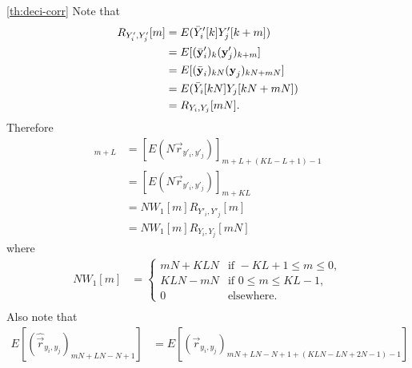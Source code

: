 \documentclass[a4paper, openany, oneside]{memoir}
\begin{document}
\begin{blockProofTheorem}{\ref{th:deci-corr}}
    Note that
    \begin{align*}
        R_{Y'_i,Y'_j}[m]
        &= E(\bar{Y}'_i[k]Y'_j[k+m]) \\
        &= E[(\bar{\boldsymbol{\mathbf{y}}}'_i)_{k}(\boldsymbol{\mathbf{y}}'_j)_{k+m}] \\
        &= E[(\bar{\boldsymbol{\mathbf{y}}}_i)_{kN}(\boldsymbol{\mathbf{y}}_j)_{kN+mN}] \\
        &= E(\bar{Y}_i[kN]Y_j[kN+mN]) \\
        &= R_{Y_i,Y_j}[mN].
    \end{align*}
    Therefore
    \begin{align*}
        [E(N\hat{\vec{r}}_{y'_i,y'_j})]_{m+L}
        &= [E(N\vec{r}_{y'_i,y'_j})]_{m+L+(KL-L+1)-1} \\
        &= [E(N\vec{r}_{y'_i,y'_j})]_{m+KL} \\
        &= N W_1[m] R_{Y'_i,Y'_j}[m] \\
        &= N W_1[m] R_{Y_i,Y_j}[mN]
    \end{align*}
    where
    \begin{align*}
        NW_1[m] &= \begin{cases}
            mN+KLN & \text{if } -KL+1 \le m \le 0, \\
            KLN-mN & \text{if } 0 \le m \le KL - 1, \\
            0 & \text{elsewhere}.
        \end{cases} \\
    \end{align*}
    Also note that
    \begin{align*}
        E[(\hat{\vec{r}}_{y_i,y_j})_{mN+LN-N+1}] &= E[(\vec{r}_{y_i,y_j})_{mN+LN-N+1 +(KLN-LN+2N-1) - 1}] \\

\end{align*}
\end{blockProofTheorem}
\end{document}
